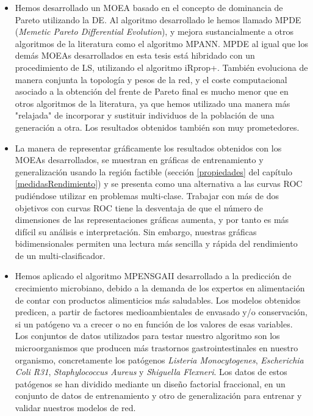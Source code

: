 \begin{itemize}
	\item Hemos desarrollado un MOEA basado en el concepto de dominancia de Pareto utilizando la DE.
	Al algoritmo desarrollado le hemos llamado MPDE (\textit{Memetic Pareto Differential
	Evolution}), y mejora sustancialmente a otros algoritmos de la literatura como el algoritmo
	MPANN. MPDE al igual que los demás MOEAs desarrollados en esta tesis está
	hibridado con un procedimiento de LS, utilizando el algoritmo iRprop+. También
	evoluciona de	manera conjunta la topología y pesos de la red, y el coste computacional
asociado a
	la	obtención del frente de Pareto final es mucho menor que en otros algoritmos de la
	literatura, ya que hemos utilizado una manera más "relajada" de incorporar y sustituir
	individuos de la población de una generación a otra. Los resultados obtenidos también son muy
	prometedores.

	\item La manera de representar gráficamente los resultados obtenidos con los MOEAs desarrollados,
	se muestran en gráficas de entrenamiento y generalización usando la región
	factible (sección \ref{propiedades} del capítulo \ref{medidasRendimiento}) y se presenta
	como una alternativa a las curvas ROC pudiéndose utilizar en problemas multi-clase. Trabajar con
	más
	de dos objetivos con curvas ROC tiene la desventaja de que el número	de dimensiones de las
	representaciones gráficas aumenta, y por tanto es más difícil su análisis e
	interpretación. Sin embargo, nuestras gráficas bidimensionales permiten una lectura más
	sencilla y rápida del rendimiento de un multi-clasificador.

	\item Hemos aplicado el algoritmo MPENSGAII desarrollado a la
	predicción de crecimiento	microbiano, debido a la demanda de los expertos en alimentación de
	contar con productos	alimenticios más	saludables. Los modelos obtenidos
	predicen, a	partir de factores medioambientales de envasado y/o conservación, si un patógeno va a
	crecer o no en función de los valores
	de esas variables. Los conjuntos de datos utilizados para testar nuestro algoritmo son los
	microorganismos que producen más trastornos gastrointestinales en nuestro organismo,
	concretamente los	patógenos \textit{Listeria Monocytogenes}, \textit{Escherichia Coli R31},
	\textit{Staphylococcus	Aureus} y \textit{Shiguella Flexneri}. Los datos de estos patógenos se
	han dividido mediante un diseño factorial fraccional, en un conjunto de datos de entrenamiento y
	otro de generalización para entrenar	y validar nuestros	modelos de red.


\end{itemize}

